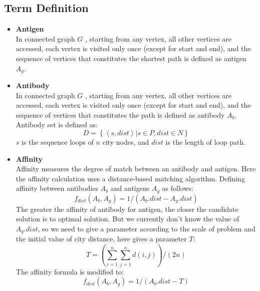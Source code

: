 \documentclass[11pt,a4paper,oldfontcommands]{memoir}
\begin{document}
\subsection{Term Definition}
\begin{itemize}
\item \textbf{Antigen}\\
In connected graph $G$ , starting from any vertex, all other vertices are accessed, each vertex is visited only once (except for start and end), and the sequence of vertices that constitutes the shortest path is defined as antigen $A_{g}$.

\item \textbf{Antibody}\\
In connected graph $G$ , starting from any vertex, all other vertices are accessed, each vertex is visited only once (except for start and end), and the sequence of vertices that constitutes the path is defined as antibody $A_{b}$. Antibody set is defined as:
\begin{equation}
D=\left \{\left \langle s,dist\right \rangle | s \in P , dist \in N \right \}
\tag{2}
\end{equation}
$s$ is the sequence loops of $n$ city nodes, and $dist$ is the length of loop path.

\item \textbf{Affinity}\\
Affinity measures the degree of match between an antibody and antigen. Here the affinity calculation uses a distance-based matching algorithm. Defining affinity between antibodies $A_{b}$ and antigens  $A_{g}$ as follows: 
\begin{equation}
f_{dist}\left(A_{b},A_{g} \right) = 1 /\left(A_{b}.dist - A_{g}.dist\right)
\tag{3}
\end{equation}
The greater the affinity of antibody for antigen, the closer the candidate solution is to optimal solution. But we currently don’t know the value of $A_{g}.dist$, so we need to give a parameter according to the scale of problem and the initial value of city distance, here gives a parameter $T$:
\begin{equation}
T = \left(\sum_{i=1}^{n} \sum_{j=1}^{n}d\left(i,j\right)\right)/\left(2n\right)
\tag{4}
\end{equation}
The affinity formula is modified to:
\begin{equation}
f_{dist}\left(A_{b},A_{g} \right) = 1 /\left(A_{b}.dist - T\right)
\tag{5}
\end{equation}


\end{itemize}
\end{document}
